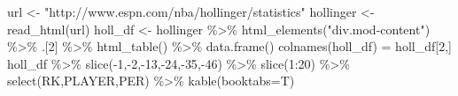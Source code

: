 \documentclass[
  11pt,
]{book}
\newenvironment{Shaded}{\begin{snugshade}}{\end{snugshade}}
\newcommand{\AttributeTok}[1]{\textcolor[rgb]{0.77,0.63,0.00}{#1}}
\newcommand{\DecValTok}[1]{\textcolor[rgb]{0.00,0.00,0.81}{#1}}
\newcommand{\FunctionTok}[1]{\textcolor[rgb]{0.00,0.00,0.00}{#1}}
\newcommand{\NormalTok}[1]{#1}
\newcommand{\OtherTok}[1]{\textcolor[rgb]{0.56,0.35,0.01}{#1}}
\newcommand{\SpecialCharTok}[1]{\textcolor[rgb]{0.00,0.00,0.00}{#1}}
\newcommand{\StringTok}[1]{\textcolor[rgb]{0.31,0.60,0.02}{#1}}
\theoremstyle{definition}
\theoremstyle{definition}
\theoremstyle{definition}
\theoremstyle{definition}
\theoremstyle{remark}
\begin{document}
\begin{Shaded}
\begin{Highlighting}[]
\NormalTok{url }\OtherTok{\textless{}{-}} \StringTok{"http://www.espn.com/nba/hollinger/statistics"}
\NormalTok{hollinger }\OtherTok{\textless{}{-}} \FunctionTok{read\_html}\NormalTok{(url)}
\NormalTok{holl\_df }\OtherTok{\textless{}{-}}\NormalTok{ hollinger }\SpecialCharTok{\%\textgreater{}\%} \FunctionTok{html\_elements}\NormalTok{(}\StringTok{"div.mod{-}content"}\NormalTok{) }\SpecialCharTok{\%\textgreater{}\%}\NormalTok{ .[}\DecValTok{2}\NormalTok{] }\SpecialCharTok{\%\textgreater{}\%}
  \FunctionTok{html\_table}\NormalTok{() }\SpecialCharTok{\%\textgreater{}\%} \FunctionTok{data.frame}\NormalTok{()}
\FunctionTok{colnames}\NormalTok{(holl\_df) }\OtherTok{=}\NormalTok{ holl\_df[}\DecValTok{2}\NormalTok{,]}
\NormalTok{holl\_df }\SpecialCharTok{\%\textgreater{}\%} \FunctionTok{slice}\NormalTok{(}\SpecialCharTok{{-}}\DecValTok{1}\NormalTok{,}\SpecialCharTok{{-}}\DecValTok{2}\NormalTok{,}\SpecialCharTok{{-}}\DecValTok{13}\NormalTok{,}\SpecialCharTok{{-}}\DecValTok{24}\NormalTok{,}\SpecialCharTok{{-}}\DecValTok{35}\NormalTok{,}\SpecialCharTok{{-}}\DecValTok{46}\NormalTok{) }\SpecialCharTok{\%\textgreater{}\%} \FunctionTok{slice}\NormalTok{(}\DecValTok{1}\SpecialCharTok{:}\DecValTok{20}\NormalTok{) }\SpecialCharTok{\%\textgreater{}\%} \FunctionTok{select}\NormalTok{(RK,PLAYER,PER) }\SpecialCharTok{\%\textgreater{}\%} \FunctionTok{kable}\NormalTok{(}\AttributeTok{booktabs=}\NormalTok{T) }
\end{Highlighting}
\end{Shaded}
\end{document}
